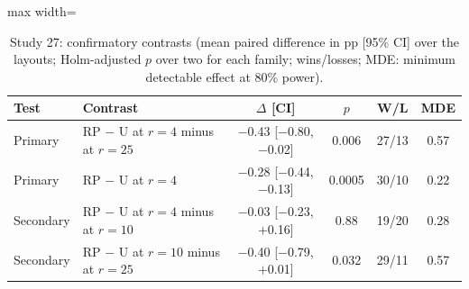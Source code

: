 \begin{table}[t]
\caption{Study 27: confirmatory contrasts (mean paired difference in pp [95\% CI] over the layouts; Holm-adjusted $p$ over two for each family; wins/losses; MDE: minimum detectable effect at 80\% power).}\label{tab:s27f}
\centering
\small
\begin{adjustbox}{max width=\linewidth}
\begin{tabular}{llcccc}
\toprule
Test & Contrast & $\Delta$ [CI] & $p$ & W/L & MDE \\
\midrule
Primary & RP $-$ U at $r=4$ minus at $r=25$ & $-$0.43 [$-$0.80, $-$0.02] & 0.006 & 27/13 & 0.57 \\
Primary & RP $-$ U at $r=4$ & $-$0.28 [$-$0.44, $-$0.13] & 0.0005 & 30/10 & 0.22 \\
Secondary & RP $-$ U at $r=4$ minus at $r=10$ & $-$0.03 [$-$0.23, $+$0.16] & 0.88 & 19/20 & 0.28 \\
Secondary & RP $-$ U at $r=10$ minus at $r=25$ & $-$0.40 [$-$0.79, $+$0.01] & 0.032 & 29/11 & 0.57 \\
\bottomrule
\end{tabular}
\end{adjustbox}
\end{table}
